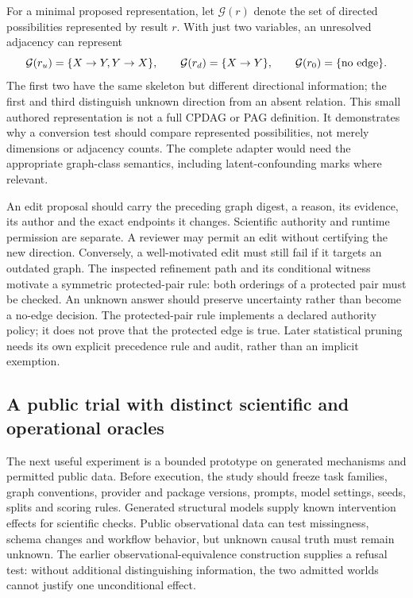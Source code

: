 For a minimal proposed representation, let $\mathcal G(r)$ denote the set of
directed possibilities represented by result $r$. With just two variables,
an unresolved adjacency can represent
\[
 \mathcal G(r_u)=\{X\to Y,Y\to X\},\qquad
 \mathcal G(r_d)=\{X\to Y\},\qquad
 \mathcal G(r_0)=\{\hbox{no edge}\}.
\]
The first two have the same skeleton but different directional information;
the first and third distinguish unknown direction from an absent relation.
This small authored representation is not a full CPDAG or PAG definition. It
demonstrates why a conversion test should compare represented possibilities,
not merely dimensions or adjacency counts. The complete adapter would need
the appropriate graph-class semantics, including latent-confounding marks
where relevant.~\citep{exec25_copilot_choice}

An edit proposal should carry the preceding graph digest, a reason, its
evidence, its author and the exact endpoints it changes. Scientific authority
and runtime permission are separate. A reviewer may permit an edit without
certifying the new direction. Conversely, a well-motivated edit must still
fail if it targets an outdated graph. The inspected refinement path and its
conditional witness motivate a symmetric protected-pair rule: both orderings
of a protected pair must be checked. An unknown answer should preserve
uncertainty rather than become a no-edge decision. The protected-pair rule
implements a declared authority policy; it does not prove that the protected
edge is true. Later statistical pruning needs its own explicit precedence
rule and audit, rather than an implicit exemption.
\citep{exec17_copilot_code,exec17_copilot_exact,exec25_copilot_choice}

\subsection{A public trial with distinct scientific and operational oracles}

The next useful experiment is a bounded prototype on generated mechanisms
and permitted public data. Before execution, the study should freeze task
families, graph conventions, provider and package versions, prompts, model
settings, seeds, splits and scoring rules. Generated structural models supply
known intervention effects for scientific checks. Public observational data
can test missingness, schema changes and workflow behavior, but unknown
causal truth must remain unknown. The earlier observational-equivalence
construction supplies a refusal test: without additional distinguishing
information, the two admitted worlds cannot justify one unconditional effect.
\citep{exec17_copilot_exact,exec25_copilot_choice}

